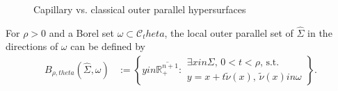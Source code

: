 \documentclass[12pt]{amsart}
\def\theta{theta}%
\def\in{in }%
\numberwithin{equation}{section}
\newcommand{\wh}{\widehat}
\newcommand{\sub}{\subset}
\newcommand{\ov}{\overline}
\newcommand{\bbR}{\mathbb{R}}
\newcommand{\8}{\infty}
\newcommand{\Si}{\Sigma}
\newcommand{\cC}{\mathcal{C}}
\newcommand{\eq}[1]{\begin{equation}\begin{alignedat}{2}#1\end{alignedat}\end{equation}}
\newcommand{\Rplus}{\bbR^{n+1}_+}
\newcommand{\Cth}{\cC_\theta}
\newcommand{\R}{\mathbb{R}}
\begin{document}
\begin{figure}
\begin{center}
\caption{Capillary vs. classical outer parallel hypersurfaces}
\label{fig:example}
\end{center}
\end{figure} 

For $\rho>0$ and a Borel set $\omega\sub\Cth$,
the local outer parallel set of $\wh\Si$ in the directions of $\omega$ can be defined by
\eq{\label{eq:def-B-rho}
B_{\rho,\theta}(\wh\Si,\omega)
&:= \left\{y\in\ov{\Rplus}:
\begin{array}{l}
\exists x\in\Si,\, 0<t<\rho,\, \text{s.t.}\\
y=x+t\tilde{\nu}(x),\,\tilde{\nu}(x)\in\omega
\end{array}
\right\}.
}
\end{document}
